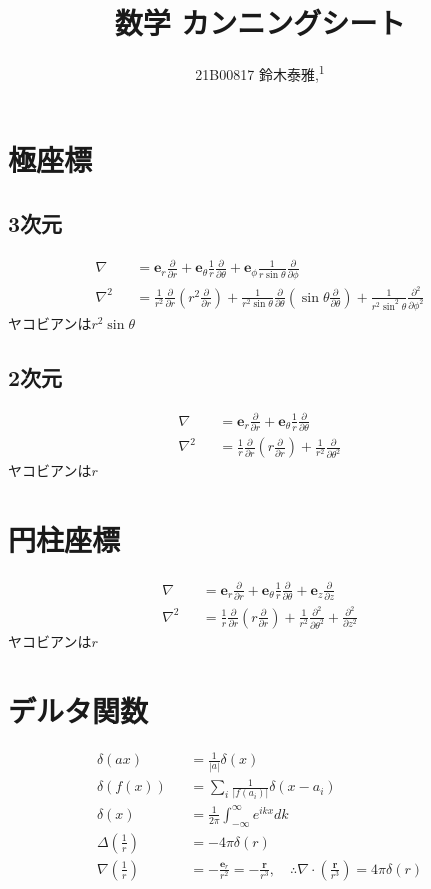 \documentclass[12pt,dvipdfmx]{jsarticle}
\newcommand\authormark[1]{\textsuperscript{#1}}
\begin{document}
\title{数学 カンニングシート}

\author{21B00817 鈴木泰雅,\authormark{1}}
\section*{\Large{極座標}}
\subsection*{3次元}
\begin{eqnarray}
  \nabla &&= \bm{e}_r \frac{\partial}{\partial r} + \bm{e}_{\theta}\frac{1}{r} \frac{\partial}{\partial\theta} + \bm{e}_{\phi}\frac{1}{r\sin\theta}\frac{\partial}{\partial \phi}\\
  \nabla^2 &&= \frac{1}{r^2}\frac{\partial}{\partial r}\left( r^2\frac{\partial}{\partial r} \right) + \frac{1}{r^2\sin\theta}\frac{\partial}{\partial\theta}\left( \sin\theta\frac{\partial}{\partial\theta} \right) + \frac{1}{r^2\sin^2\theta}\frac{\partial^2}{\partial \phi^2}
\end{eqnarray}
ヤコビアンは$r^2\sin\theta$
\subsection*{2次元}
\begin{eqnarray}
  \nabla &&= \bm{e}_r \frac{\partial}{\partial r} + \bm{e}_{\theta}\frac{1}{r} \frac{\partial}{\partial\theta}\\
  \nabla^2 &&= \frac{1}{r}\frac{\partial}{\partial r}\left( r \frac{\partial}{\partial r} \right) + \frac{1}{r^2}\frac{\partial}{\partial\theta^2}
\end{eqnarray}
ヤコビアンは$r$
\section*{\Large{円柱座標}}
\begin{eqnarray}
  \nabla &&= \bm{e}_r \frac{\partial}{\partial r} + \bm{e}_{\theta}\frac{1}{r}\frac{\partial}{\partial \theta} +\bm{e}_z \frac{\partial}{\partial z}\\
  \nabla^2 &&= \frac{1}{r}\frac{\partial}{\partial r}\left( r\frac{\partial}{\partial r} \right) + \frac{1}{r^2}\frac{\partial^2}{\partial\theta^2} + \frac{\partial^2}{\partial z^2}
\end{eqnarray}
ヤコビアンは$r$
\section*{\Large{デルタ関数}}
\begin{eqnarray}
  \delta(ax) &&= \frac{1}{|a|}\delta(x)\\
  \delta(f(x)) &&= \sum_i \frac{1}{|f(a_i)|}\delta(x-a_i)\\
  \delta(x) &&= \frac{1}{2\pi}\int_{-\infty}^{\infty} e^{ikx}dk\\
  \Delta\left( \frac{1}{r} \right) &&= -4\pi\delta(r)\\
  \nabla\left( \frac{1}{r} \right) &&= -\frac{\bm{e}_r}{r^2} = -\frac{\bm{r}}{r^3},\quad\therefore \nabla\cdot\left( \frac{\bm{r}}{r^3} \right) = 4\pi\delta(r)
\end{eqnarray}
\end{document}
